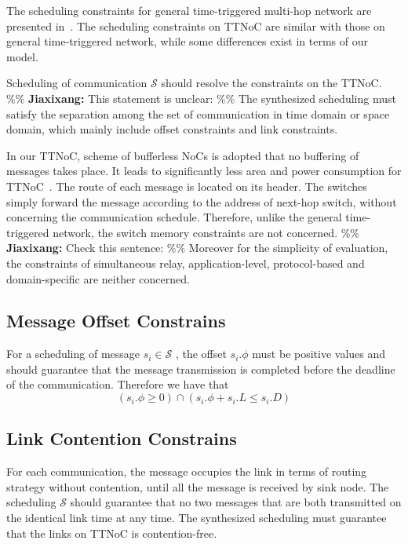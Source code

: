 \documentclass[journal]{IEEEtran}
\newcommand{\calS}{\mathcal{S}}
\newcommand{\jx}[1]{\%\% \textbf{Jiaxixang: }#1 \%\%\xspace}
\begin{document}
The scheduling constraints for general time-triggered multi-hop
network are presented in~\cite{DBLP:conf/rtss/Steiner10}.  The
scheduling constraints on TTNoC are similar with those on general
time-triggered network, while some differences exist in terms of our
model.

Scheduling of communication $\calS$ should resolve the constraints on
the TTNoC. \jx{This statement is unclear:}  The synthesized scheduling must satisfy the separation
among the set of communication in time domain or space domain, which
mainly include offset constraints and link constraints.

In our TTNoC, scheme of bufferless NoCs is adopted that no buffering
of messages takes place.  It leads to significantly less area and
power consumption for TTNoC~\cite{DBLP:journals/tpds/ShpinerKLCK15}.
The route of each message is located on its header.  The switches
simply forward the message according to the address of next-hop
switch, without concerning the communication schedule. Therefore,
unlike the general time-triggered network, the switch memory
constraints are not concerned. \jx{Check this sentence:} Moreover for
the simplicity of evaluation, the constraints of simultaneous relay,
application-level, protocol-based and domain-specific are neither
concerned.

\subsection{Message Offset Constrains}

For a scheduling of message $s_{i}\in\calS$ , the offset $s_i.\phi$  must be positive values and should guarantee that the message transmission is completed before the deadline of the communication. Therefore we have that
\begin{equation}
	(s_i.\phi
	\geq 0)
	\cap
	(s_i.\phi + s_i.L
	\leq
	s_i.D)
\end{equation}

\subsection{Link Contention Constrains}

For each communication, the message occupies the link in terms of routing strategy without contention, 
until all the message is received by sink node.
The scheduling $\calS$ should guarantee that no two messages that are both transmitted on the identical link time at any time. 
The synthesized scheduling must guarantee that the links on TTNoC is contention-free.
\end{document}
